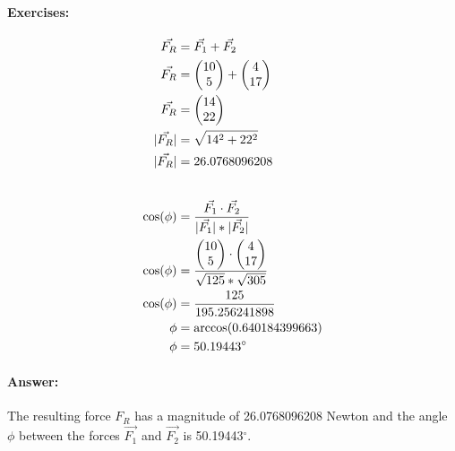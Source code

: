 \paragraph{Exercises:}
\begin{align}
   \vec{F_R} &= \vec{F_1} + \vec{F_2}  \\
   \vec{F_R} &= \begin{pmatrix} 10 \\ 5 \end{pmatrix} + \begin{pmatrix} 4 \\ 17 \end{pmatrix} \\
   \vec{F_R} &= \begin{pmatrix} 14 \\ 22 \end{pmatrix} \\
   |\vec{F_R}| &= \sqrt{14^2 + 22^2} \\
   |\vec{F_R}| &= 26.0768096208 \\[20pt]
   \cos(\phi) &= \frac{\vec{F_1} \cdot \vec{F_2}}{|\vec{F_1}| * |\vec{F_2}|} \\
   \cos(\phi) &= \frac{\begin{pmatrix} 10 \\ 5 \end{pmatrix} \cdot \begin{pmatrix} 4 \\ 17 \end{pmatrix}}{\sqrt{125} * \sqrt{305}} \\
   \cos(\phi) &= \frac{125}{195.256241898} \\
   \phi &= \arccos(0.640184399663) \\
   \phi &= 50.19443^\circ
\end{align}

\paragraph{Answer:}
The resulting force $F_R$ has a magnitude of 26.0768096208 Newton and the angle $\phi$ between the forces 
$\vec{F_1}$ and $\vec{F_2}$ is 50.19443$^\circ$.
